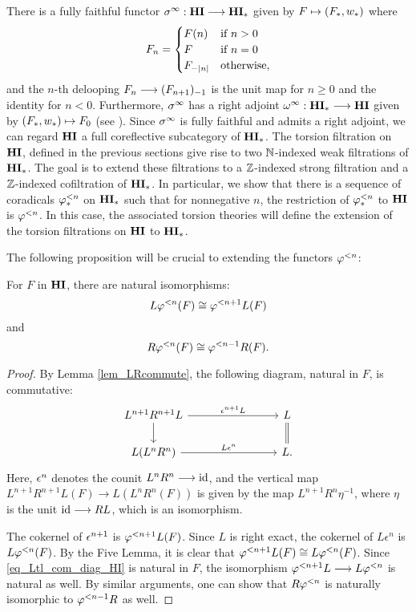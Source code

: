 There is a fully faithful functor $\spectHI: \HI \to \HM$ given
by $F \mapsto (F_*, \deloop_*)$ where
\[
F_n = \begin{cases}
F(n) &\textrm{if }n > 0 \\
F    &\textrm{if }n = 0 \\
\RHI[|n|]F &\textrm{otherwise},
\end{cases}
\]
and the $n$-th delooping $F_n \to \RHI{(F_{n + 1})}$ is the unit
map for $n \geq 0$ and the identity for $n < 0$. Furthermore, 
$\spectHI$ has a right adjoint $\loopHM: \HM \to \HI$ given by 
$(F_*, \deloop_*) \mapsto F_0$ (see \cite[1.18]{DegModHom}). 
Since $\spectHI$ is fully faithful and admits a right adjoint, 
we can regard $\HI$ a full coreflective subcategory of $\HM$. The
torsion filtration on $\HI$, defined in the previous sections 
give rise to two $\N$-indexed weak filtrations of $\HM$. The goal 
is to extend these filtrations to a $\Z$-indexed strong filtration 
and a $\Z$-indexed cofiltration of $\HM$. In particular, we show
that there is a sequence of coradicals $\tlHM{n}$
on $\HM$ such that for nonnegative $n$, the restriction of 
$\tlHM{n}$ to $\HI$ is $\tlHI{n}$. In this case, the associated
torsion theories will define the extension of the torsion 
filtrations on $\HI$ to $\HM$.

The following proposition will be crucial to extending the 
functors $\tlHI{n}$:

\begin{prop}\label{prop_tl_L_R}
For $F$ in $\HI$, there are natural isomorphisms:
\[
L \tlHI{n}(F) \cong \tlHI{n + 1} L(F)
\]
and
\[
R\tlHI{n}(F) \cong \tlHI{n - 1}R(F).
\] 
\end{prop}
\begin{proof}
By Lemma \ref{lem_LRcommute}, the following diagram, natural in $F$, 
is commutative:
\begin{equation}\label{eq_Ltl_com_diag_HI}
\begin{tikzcd}[column sep=80pt]
L^{n + 1}R^{n + 1}L \arrow{r}{\cuHI^{n + 1}L} \arrow{d} &
L \arrow[equals]{d} \\
L(L^{n}R^n) \arrow{r}{L\cuHI^{n}} &
L.
\end{tikzcd}
\end{equation}
Here, $\cuHI^n$ denotes the counit $L^nR^n \to \id$,
and the vertical map $L^{n + 1}R^{n + 1}L(F) \to L(L^nR^n (F))$ is 
given by the map $L^{n + 1}R^n \eta^{-1}$, where $\eta$ is
the unit $\id \to RL$, which is an isomorphism.

The cokernel of $\cuHI^{n + 1}$ is $\tlHI{n + 1}L(F)$. Since $L$ 
is right exact, the cokernel of $L\epsilon^n$ is $L\tlHI{n}(F)$. 
By the Five Lemma, it is clear that $\tlHI{n + 1}L(F) \cong 
L\tlHI{n}(F)$. Since \eqref{eq_Ltl_com_diag_HI} is natural in $F$,
the isomorphism $\tlHI{n + 1}L \to L\tlHI{n}$ is natural as well.
By similar arguments, one can show that $R\tlHI{n}$ is naturally
isomorphic to $\tlHI{n - 1}R$ as well.
\end{proof}

